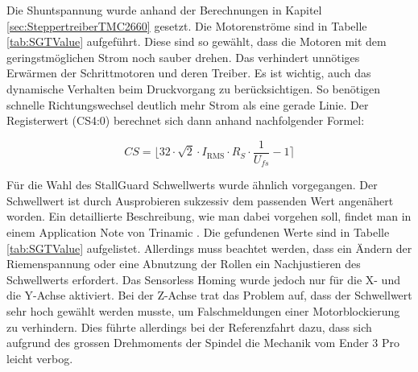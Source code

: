 Die Shuntspannung wurde anhand der Berechnungen in Kapitel \ref{sec:SteppertreiberTMC2660} gesetzt. Die Motorenströme sind in Tabelle \ref{tab:SGTValue} aufgeführt. Diese sind so gewählt, dass die Motoren mit dem geringstmöglichen Strom noch sauber drehen. Das verhindert unnötiges Erwärmen der Schrittmotoren und deren Treiber. Es ist wichtig, auch das dynamische Verhalten beim Druckvorgang zu berücksichtigen. So benötigen schnelle Richtungswechsel deutlich mehr Strom als eine gerade Linie. Der Registerwert (CS4:0) berechnet sich dann anhand nachfolgender Formel:

\begin{equation}
	CS = \lfloor 32\cdot \sqrt{2}\cdot I_{\text{RMS}} \cdot R_S \cdot \frac{1}{U_{fs}} -1 \rceil
 	\label{equ:CurrentSetting}
\end{equation} 


Für die Wahl des StallGuard Schwellwerts wurde ähnlich vorgegangen. Der Schwellwert ist durch Ausprobieren sukzessiv dem passenden Wert angenähert worden. Ein detaillierte Beschreibung, wie man dabei vorgehen soll, findet man in einem Application Note von Trinamic \cite{StallGuardAppnote}. Die gefundenen Werte sind in Tabelle \ref{tab:SGTValue} aufgelistet. Allerdings muss beachtet werden, dass ein Ändern der Riemenspannung oder eine Abnutzung der Rollen ein Nachjustieren des Schwellwerts erfordert. Das Sensorless Homing wurde jedoch nur für die X- und die Y-Achse aktiviert. Bei der Z-Achse trat das Problem auf, dass der Schwellwert sehr hoch gewählt werden musste, um Falschmeldungen einer Motorblockierung zu verhindern. Dies führte allerdings bei der Referenzfahrt dazu, dass sich aufgrund des grossen Drehmoments der Spindel die Mechanik vom Ender 3 Pro leicht verbog.


